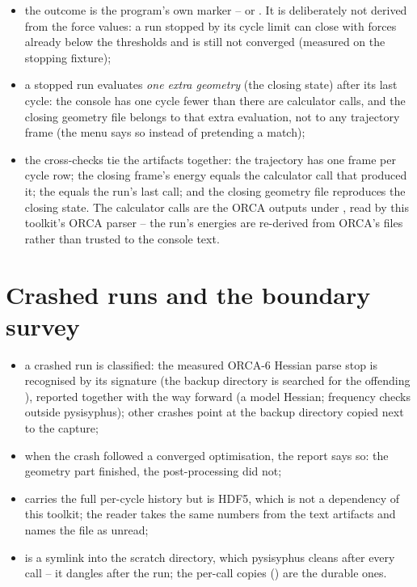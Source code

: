 \begin{itemize}
  \item the outcome is the program's own marker --  or
    .  It is deliberately not derived from
    the force values: a run stopped by its cycle limit can close with forces
    already below the thresholds and is still not converged (measured on the
    stopping fixture);
  \item a stopped run evaluates \emph{one extra geometry} (the closing state)
    after its last cycle: the console has one cycle fewer than there are
    calculator calls, and the closing geometry file belongs to that extra
    evaluation, not to any trajectory frame (the menu says so instead of
    pretending a match);
  \item the cross-checks tie the artifacts together: the trajectory has one
    frame per cycle row; the closing frame's energy equals the calculator call
    that produced it; the  equals the run's last call; and
    the closing geometry file reproduces the closing state.  The calculator
    calls are the ORCA outputs under , read by this toolkit's
    ORCA parser -- the run's energies are re-derived from ORCA's files rather
    than trusted to the console text.
\end{itemize}

\section{Crashed runs and the boundary survey}

\begin{readbox}
\begin{itemize}
  \item a crashed run is classified: the measured ORCA-6 Hessian parse stop is
    recognised by its  signature (the 
    backup directory is searched for the offending ), reported
    together with the way forward (a model Hessian; frequency checks outside
    pysisyphus); other crashes point at the backup directory copied next to
    the capture;
  \item when the crash followed a converged optimisation, the report says so:
    the geometry part finished, the post-processing did not;
  \item {} carries the full per-cycle history but is
    HDF5, which is not a dependency of this toolkit; the reader takes the same
    numbers from the text artifacts and names the file as unread;
  \item {} is a symlink into the scratch directory,
    which pysisyphus cleans after every call -- it dangles after the run; the
    per-call copies () are the durable ones.
\end{itemize}
\end{readbox}
